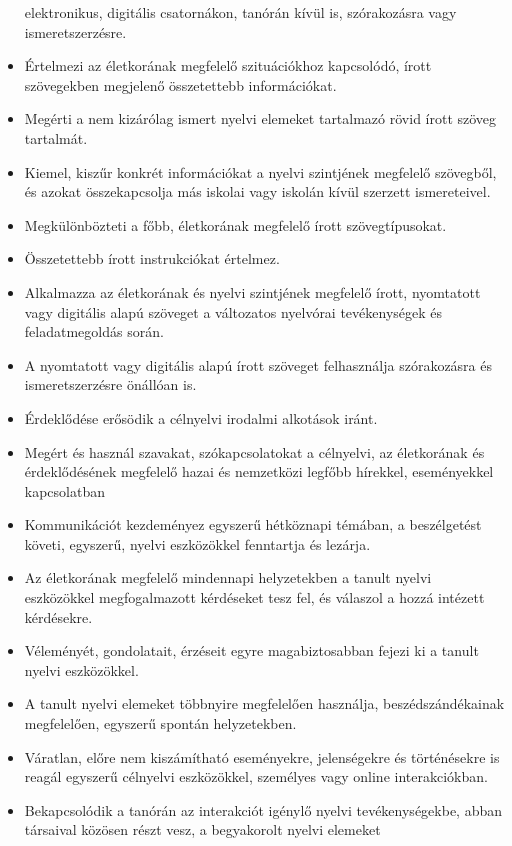 \begin{itemize}
  elektronikus, digitális csatornákon, tanórán kívül is, szórakozásra
  vagy ismeretszerzésre.
\item
  Értelmezi az életkorának megfelelő szituációkhoz kapcsolódó, írott
  szövegekben megjelenő összetettebb információkat.
\item
  Megérti a nem kizárólag ismert nyelvi elemeket tartalmazó rövid írott
  szöveg tartalmát.
\item
  Kiemel, kiszűr konkrét információkat a nyelvi szintjének megfelelő
  szövegből, és azokat összekapcsolja más iskolai vagy iskolán kívül
  szerzett ismereteivel.
\item
  Megkülönbözteti a főbb, életkorának megfelelő írott szövegtípusokat.
\item
  Összetettebb írott instrukciókat értelmez.
\item
  Alkalmazza az életkorának és nyelvi szintjének megfelelő írott,
  nyomtatott vagy digitális alapú szöveget a változatos nyelvórai
  tevékenységek és feladatmegoldás során.
\item
  A nyomtatott vagy digitális alapú írott szöveget felhasználja
  szórakozásra és ismeretszerzésre önállóan is.
\item
  Érdeklődése erősödik a célnyelvi irodalmi alkotások iránt.
\item
  Megért és használ szavakat, szókapcsolatokat a célnyelvi, az
  életkorának és érdeklődésének megfelelő hazai és nemzetközi legfőbb
  hírekkel, eseményekkel kapcsolatban
\item
  Kommunikációt kezdeményez egyszerű hétköznapi témában, a beszélgetést
  követi, egyszerű, nyelvi eszközökkel fenntartja és lezárja.
\item
  Az életkorának megfelelő mindennapi helyzetekben a tanult nyelvi
  eszközökkel megfogalmazott kérdéseket tesz fel, és válaszol a hozzá
  intézett kérdésekre.
\item
  Véleményét, gondolatait, érzéseit egyre magabiztosabban fejezi ki a
  tanult nyelvi eszközökkel.
\item
  A tanult nyelvi elemeket többnyire megfelelően használja,
  beszédszándékainak megfelelően, egyszerű spontán helyzetekben.
\item
  Váratlan, előre nem kiszámítható eseményekre, jelenségekre és
  történésekre is reagál egyszerű célnyelvi eszközökkel, személyes vagy
  online interakciókban.
\item
  Bekapcsolódik a tanórán az interakciót igénylő nyelvi tevékenységekbe,
  abban társaival közösen részt vesz, a begyakorolt nyelvi elemeket

\end{itemize}
